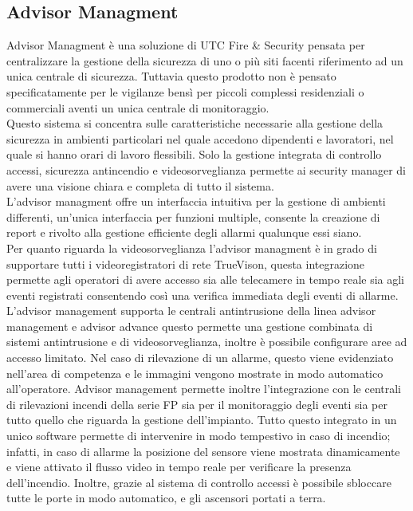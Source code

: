 \subsection{Advisor Managment}
Advisor Managment è una soluzione di UTC Fire \& Security pensata per centralizzare la gestione della sicurezza di uno o più siti facenti riferimento ad un unica centrale di sicurezza. Tuttavia questo prodotto non è pensato specificatamente per le vigilanze bensì per piccoli complessi residenziali o commerciali aventi un unica centrale di monitoraggio.\\
Questo sistema si concentra sulle caratteristiche necessarie alla gestione della sicurezza in ambienti particolari nel quale accedono dipendenti e lavoratori, nel quale si hanno orari di lavoro flessibili. Solo la gestione integrata di controllo accessi, sicurezza antincendio e videosorveglianza permette ai security manager di avere una visione chiara e completa di tutto il sistema.\\
L'advisor managment offre un interfaccia intuitiva per la gestione di ambienti differenti, un'unica interfaccia per funzioni multiple, consente la creazione di report e rivolto alla gestione efficiente degli allarmi qualunque essi siano.\\
Per quanto riguarda la videosorveglianza l'advisor managment è in grado di supportare tutti i videoregistratori di rete TrueVison, questa integrazione permette agli operatori di avere accesso sia alle telecamere in tempo reale sia agli eventi registrati consentendo così una verifica immediata degli eventi di allarme.\\ 
L'advisor management supporta le centrali antintrusione della linea advisor management e advisor advance questo permette una gestione combinata di sistemi antintrusione e di videosorveglianza, inoltre è possibile configurare aree ad accesso limitato. Nel caso di rilevazione di un allarme, questo viene evidenziato nell'area di competenza e le immagini vengono mostrate in modo automatico all'operatore. Advisor management permette inoltre l'integrazione con le centrali di rilevazioni incendi della serie FP sia per il monitoraggio degli eventi sia per tutto quello che riguarda la gestione dell'impianto. Tutto questo integrato in un unico software permette di intervenire in modo tempestivo in caso di incendio; infatti, in caso di allarme la posizione del sensore viene mostrata dinamicamente e viene attivato il flusso video in tempo reale per verificare la presenza dell'incendio. Inoltre, grazie al sistema di controllo accessi è possibile sbloccare tutte le porte in modo automatico, e gli ascensori portati a terra.
